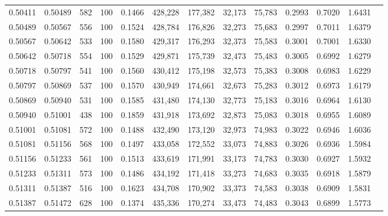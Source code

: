 \begin{tabular}{rrrrrrrrrrrrr}
0.50411 & 0.50489 &   582 & 100 &                                     0.1466 & 428,228 & 177,382 &  32,173 &  75,783 & 0.2993 & 0.7020 & 1.6431 \\
0.50489 & 0.50567 &   556 & 100 &                                     0.1524 & 428,784 & 176,826 &  32,273 &  75,683 & 0.2997 & 0.7011 & 1.6379 \\
0.50567 & 0.50642 &   533 & 100 &                                     0.1580 & 429,317 & 176,293 &  32,373 &  75,583 & 0.3001 & 0.7001 & 1.6330 \\
0.50642 & 0.50718 &   554 & 100 &                                     0.1529 & 429,871 & 175,739 &  32,473 &  75,483 & 0.3005 & 0.6992 & 1.6279 \\
0.50718 & 0.50797 &   541 & 100 &                                     0.1560 & 430,412 & 175,198 &  32,573 &  75,383 & 0.3008 & 0.6983 & 1.6229 \\
0.50797 & 0.50869 &   537 & 100 &                                     0.1570 & 430,949 & 174,661 &  32,673 &  75,283 & 0.3012 & 0.6973 & 1.6179 \\
0.50869 & 0.50940 &   531 & 100 &                                     0.1585 & 431,480 & 174,130 &  32,773 &  75,183 & 0.3016 & 0.6964 & 1.6130 \\
0.50940 & 0.51001 &   438 & 100 &                                     0.1859 & 431,918 & 173,692 &  32,873 &  75,083 & 0.3018 & 0.6955 & 1.6089 \\
0.51001 & 0.51081 &   572 & 100 &                                     0.1488 & 432,490 & 173,120 &  32,973 &  74,983 & 0.3022 & 0.6946 & 1.6036 \\
0.51081 & 0.51156 &   568 & 100 &                                     0.1497 & 433,058 & 172,552 &  33,073 &  74,883 & 0.3026 & 0.6936 & 1.5984 \\
0.51156 & 0.51233 &   561 & 100 &                                     0.1513 & 433,619 & 171,991 &  33,173 &  74,783 & 0.3030 & 0.6927 & 1.5932 \\
0.51233 & 0.51311 &   573 & 100 &                                     0.1486 & 434,192 & 171,418 &  33,273 &  74,683 & 0.3035 & 0.6918 & 1.5879 \\
0.51311 & 0.51387 &   516 & 100 &                                     0.1623 & 434,708 & 170,902 &  33,373 &  74,583 & 0.3038 & 0.6909 & 1.5831 \\
0.51387 & 0.51472 &   628 & 100 &                                     0.1374 & 435,336 & 170,274 &  33,473 &  74,483 & 0.3043 & 0.6899 & 1.5773 \\

\end{tabular}
